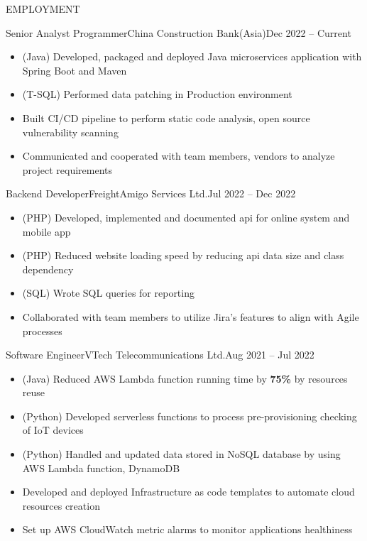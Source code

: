\documentclass[]{resume}
\begin{document}
	\makeheader
	
	\begin{cvsection}{EMPLOYMENT}
		\begin{cvsubsection}{Senior Analyst Programmer}{China Construction Bank(Asia)}{Dec 2022 -- Current}
			\begin{itemize}
				\item (Java) Developed, packaged and deployed Java microservices application with Spring Boot and Maven
				\item (T-SQL) Performed data patching in Production environment 
				\item Built CI/CD pipeline to perform static code analysis, open source vulnerability scanning
				\item Communicated and cooperated with team members, vendors to analyze project requirements
			\end{itemize}
		\end{cvsubsection}
		
		\begin{cvsubsection}{Backend Developer}{FreightAmigo Services Ltd.}{Jul 2022 -- Dec 2022}
			\begin{itemize}
				\item (PHP) Developed, implemented and documented api for online system and mobile app
				\item (PHP) Reduced website loading speed by reducing api data size and class dependency
				\item (SQL) Wrote SQL queries for reporting
    				\item Collaborated with team members to utilize Jira's features to align with Agile processes
			\end{itemize}
		\end{cvsubsection}
		
		\begin{cvsubsection}{Software Engineer}{VTech Telecommunications Ltd.}{Aug 2021 -- Jul 2022}
			\begin{itemize}
				\item (Java) Reduced AWS Lambda function running time by \textbf{75\%} by resources reuse
				\item (Python) Developed serverless functions to process pre-provisioning checking of IoT devices
				\item (Python) Handled and updated data stored in NoSQL database by using AWS Lambda function, DynamoDB
				\item Developed and deployed Infrastructure as code templates to automate cloud resources creation
				\item Set up AWS CloudWatch metric alarms to monitor applications healthiness
			\end{itemize}
		\end{cvsubsection}
		

\end{cvsection}
\end{document}
